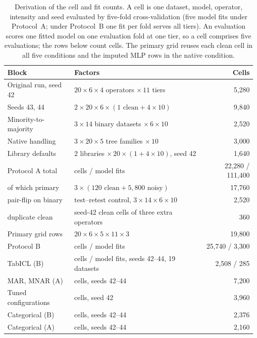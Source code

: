 \begin{table}[t]
\centering
\footnotesize
\caption{Derivation of the cell and fit counts. A cell is one dataset, model, operator, intensity and seed evaluated by five-fold cross-validation (five model fits under Protocol~A; under Protocol~B one fit per fold serves all tiers). An evaluation scores one fitted model on one evaluation fold at one tier, so a cell comprises five evaluations; the rows below count cells. The primary grid reuses each clean cell in all five conditions and the imputed MLP rows in the native condition.}
\label{tab:accounting}
\begin{tabular}{@{}p{3.3cm}p{5.2cm}r@{}}
\toprule
Block & Factors & Cells \\
\midrule
Original run, seed 42 & $20\times6\times4$ operators $\times\,11$ tiers & 5{,}280 \\
Seeds 43, 44 & $2\times20\times6\times(1\text{ clean}+4\times10)$ & 9{,}840 \\
Minority-to-majority & $3\times14$ binary datasets $\times\,6\times10$ & 2{,}520 \\
Native handling & $3\times20\times5$ tree families $\times\,10$ & 3{,}000 \\
Library defaults & $2$ libraries $\times\,20\times(1+4\times10)$, seed 42 & 1{,}640 \\
\midrule
Protocol A total & cells / model fits & 22{,}280 / 111{,}400 \\
\quad of which primary & $3\times(120\text{ clean}+5{,}800\text{ noisy})$ & 17{,}760 \\
\quad pair-flip on binary & test--retest control, $3\times14\times6\times10$ & 2{,}520 \\
\quad duplicate clean & seed-42 clean cells of three extra operators & 360 \\
Primary grid rows & $20\times6\times5\times11\times3$ & 19{,}800 \\
Protocol B & cells / model fits & 25{,}740 / 3{,}300 \\
TabICL (B) & cells / model fits, seeds 42--44, 19 datasets & 2{,}508 / 285 \\
MAR, MNAR (A) & cells, seeds 42--44 & 7{,}200 \\
Tuned configurations & cells, seed 42 & 3{,}960 \\
Categorical (B) & cells, seeds 42--44 & 2{,}376 \\
Categorical (A) & cells, seeds 42--44 & 2{,}160 \\
\bottomrule
\end{tabular}
\end{table}
